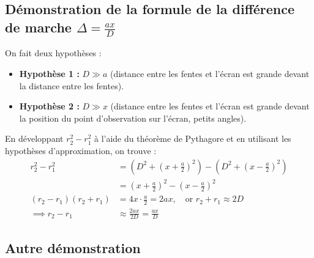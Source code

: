 \documentclass[a4paper,12pt]{article}
\begin{document}
\begin{center}
        \end{center}

    \subsection*{Démonstration de la formule de la différence de marche $\Delta = \frac{a x}{D}$}

        On fait deux hypothèses :
        \begin{itemize}
            \item \textbf{Hypothèse 1 :} $D \gg a$ (distance entre les fentes et l'écran est grande devant la distance entre les fentes).
            \item \textbf{Hypothèse 2 :} $D \gg x$ (distance entre les fentes et l'écran est grande devant la position du point d'observation sur l'écran, petits angles).
        \end{itemize}

        En développant $r_2^2 - r_1^2$ à l'aide du théorème de Pythagore et en utilisant les hypothèses d'approximation, on trouve :
        \begin{align*}
            r_2^2 - r_1^2 &= (D^2 + (x + \frac{a}{2})^2) - (D^2 + (x - \frac{a}{2})^2) \\
            &= (x + \frac{a}{2})^2 - (x - \frac{a}{2})^2 \\
            (r_2 - r_1) (r_2 + r_1) &= 4 x \cdot \frac{a}{2} = 2 a x, \quad \text{or } r_2 + r_1 \approx 2D \\
            \implies r_2 - r_1 &\approx \frac{2 a x}{2 D} = \frac{a x}{D}
        \end{align*}

    \subsection{Autre démonstration}
            
\end{document}
